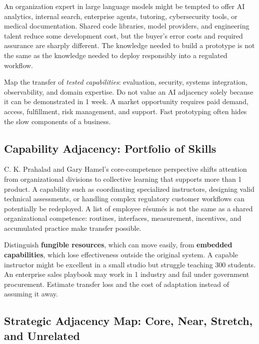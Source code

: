 An organization expert in large language models might be tempted to offer AI analytics, internal search, enterprise agents, tutoring, cybersecurity tools, or medical documentation. Shared code libraries, model providers, and engineering talent reduce some development cost, but the buyer's error costs and required assurance are sharply different. The knowledge needed to build a prototype is not the same as the knowledge needed to deploy responsibly into a regulated workflow.

Map the transfer of \textit{tested capabilities}: evaluation, security, systems integration, observability, and domain expertise. Do not value an AI adjacency solely because it can be demonstrated in 1 week. A market opportunity requires paid demand, access, fulfillment, risk management, and support. Fast prototyping often hides the slow components of a business.

\subsection{Capability Adjacency: Portfolio of Skills}
\label{sec:capability_adjacency_portfolio_of_skills}

C. K. Prahalad and Gary Hamel's core-competence perspective shifts attention from organizational divisions to collective learning that supports more than 1 product. A capability such as coordinating specialized instructors, designing valid technical assessments, or handling complex regulatory customer workflows can potentially be redeployed. A list of employee résumés is not the same as a shared organizational competence: routines, interfaces, measurement, incentives, and accumulated practice make transfer possible.

Distinguish \textbf{fungible resources}, which can move easily, from \textbf{embedded capabilities}, which lose effectiveness outside the original system. A capable instructor might be excellent in a small studio but struggle teaching 300 students. An enterprise sales playbook may work in 1 industry and fail under government procurement. Estimate transfer loss and the cost of adaptation instead of assuming it away.

\subsection{Strategic Adjacency Map: Core, Near, Stretch, and Unrelated}
\label{sec:strategic_adjacency_map_four_bands}

